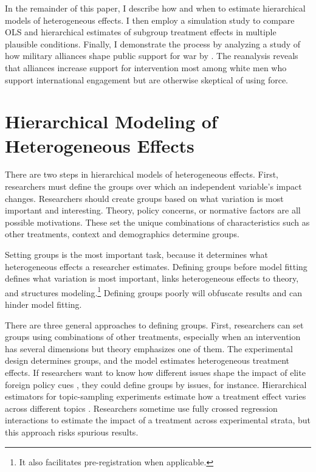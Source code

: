 \documentclass[12pt]{article}
\begin{document}
In the remainder of this paper, I describe how and when to estimate hierarchical models of heterogeneous effects.
I then employ a simulation study to compare OLS and hierarchical estimates of subgroup treatment effects in multiple plausible conditions.
Finally, I demonstrate the process by analyzing a study of how military alliances shape public support for war by \citet{TomzWeeks2021}. 
The reanalysis reveals that alliances increase support for intervention most among white men who support international engagement but are otherwise skeptical of using force. 



\section{Hierarchical Modeling of Heterogeneous Effects}


There are two steps in hierarchical models of heterogeneous effects. 
First, researchers must define the groups over which an independent variable's impact changes. 
Researchers should create groups based on what variation is most important and interesting. 
Theory, policy concerns, or normative factors are all possible motivations. 
These set the unique combinations of characteristics such as other treatments, context and demographics determine groups.


Setting groups is the most important task, because it determines what heterogeneous effects a researcher estimates. 
Defining groups before model fitting defines what variation is most important, links heterogeneous effects to theory, and structures modeling.\footnote{It also facilitates pre-registration when applicable.}
Defining groups poorly will obfuscate results and can hinder model fitting.
   


There are three general approaches to defining groups.  
First, researchers can set groups using combinations of other treatments, especially when an intervention has several dimensions but theory emphasizes one of them. 
The experimental design determines groups, and the model estimates heterogeneous treatment effects.   
If researchers want to know how different issues shape the impact of elite foreign policy cues \citep{GuisingerSaunders2017}, they could define groups by issues, for instance.
Hierarchical estimators for topic-sampling experiments estimate how a treatment effect varies across different topics \citep{CliffordRainey2023}. 
Researchers sometime use fully crossed regression interactions to estimate the impact of a treatment across experimental strata, but this approach risks spurious results. 
\end{document}
